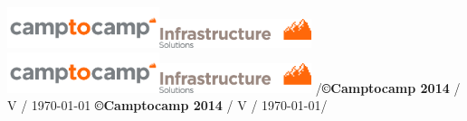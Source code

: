 \usepackage{lastpage}
\usepackage[headsepline,footsepline]{scrlayer-scrpage}


\newcommand{\ctoclogo}{\includegraphics[width=12em]{camptocamp.png}}
\newcommand{\ctocinfralogo}{\includegraphics[width=12em]{rapport_logo_haut_droite_infrastructure_rgb.png}}
\newcommand{\ctocinfraheader}{\ctoclogo\hfill{}\ctocinfralogo}

\usepackage[ddmmyyyy]{datetime}
\renewcommand{\dateseparator}{.}

\newcommand{\footerstyle}{\color{c2c}\normalfont}
\newcommand{\ctoccopyright}{\textbf{\copyright Camptocamp 2014} /  V\docversion{} / \today}
\newcommand{\pagenum}{\pagemark/\pageref{LastPage}}

%
  {%
    {\ctocinfraheader}
    {\ctocinfraheader}
    {}
  }%
  {%
    {\footerstyle\pagenum\hfill\ctoccopyright}
    {\footerstyle\ctoccopyright\hfill\pagenum}
    {}
  } %

\pagestyle{c2c}
\renewcommand*{\chapterpagestyle}{c2c}
